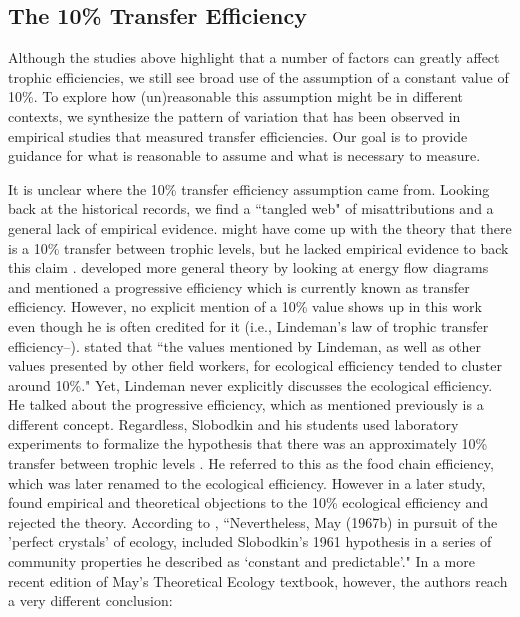 \documentclass[oneside,12pt,final]{sty/ucthesis-CA2012}
\let\cite\citep                             %
\begin{document}
\begin{mainmatter}
\subsection{The 10\% Transfer Efficiency}
Although the studies above highlight that a number of factors can greatly affect trophic efficiencies, we still see broad use of the assumption of a constant value of 10\%. To explore how (un)reasonable this assumption might be in different contexts, we synthesize the pattern of variation that has been observed in empirical studies that measured transfer efficiencies. Our goal is to provide guidance for what is reasonable to assume and what is necessary to measure.

\vspace{5mm}

It is unclear where the 10\% transfer efficiency assumption came from. Looking back at the historical records, we find a ``tangled web" of misattributions and a general lack of empirical evidence. \citet{semper1881animal} might have come up with the theory that there is a 10\% transfer between trophic levels, but he lacked empirical evidence to back this claim \cite{mcintosh1986background}. \citet{lindeman1942trophic} developed more general theory by looking at energy flow diagrams and mentioned a progressive efficiency which is currently known as transfer efficiency. However, no explicit mention of a 10\% value shows up in this work even though he is often credited for it (i.e., Lindeman's law of trophic transfer efficiency--\citealt{chapman1998ecology}). \citet{slobodkin1959energetics, slobodkin1972inconstancy} stated that ``the values mentioned by Lindeman, as well as other values presented by other field workers, for ecological efficiency tended to cluster around 10\%." Yet, Lindeman never explicitly discusses the ecological efficiency. He talked about the progressive efficiency, which as mentioned previously is a different concept. Regardless, Slobodkin and his students used laboratory experiments to formalize the hypothesis that there was an approximately 10\% transfer between trophic levels \cite{slobodkin1959energetics}. He referred to this as the food chain efficiency, which was later renamed to the ecological efficiency. However in a later study, \citet{slobodkin1972inconstancy} found empirical and theoretical objections to the 10\% ecological efficiency and rejected the theory. According to \citet{mcintosh1986background}, ``Nevertheless, May (1967b) in pursuit of the 'perfect crystals' of ecology, included Slobodkin's 1961 hypothesis in a series of community properties he described as `constant and predictable'." In a more recent edition of May's Theoretical Ecology textbook, however, the authors reach a very different conclusion:


\end{mainmatter}
\end{document}
